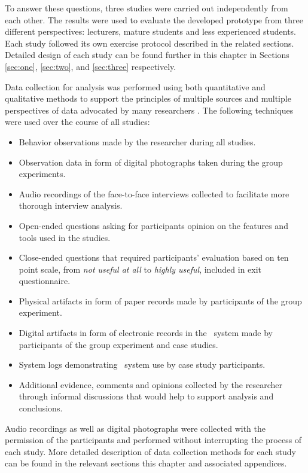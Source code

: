 To answer these questions, three studies were carried out independently from
each other. The results were used to evaluate the developed prototype from three
different perspectives: lecturers, mature students and less experienced
students. Each study followed its own exercise protocol described in the related
sections. Detailed design of each study can be found further in this chapter in
Sections \ref{sec:one}, \ref{sec:two}, and \ref{sec:three} respectively.

Data collection for analysis was performed using both quantitative and
qualitative methods to support the principles of multiple sources and multiple
perspectives of data advocated by many researchers
\citep{Yin2009,Maimbo2005,Marshall2010}. The following techniques were used over
the course of all studies:

\begin{itemize}
  \item Behavior observations made by the researcher during all studies.
  \item Observation data in form of digital photographs taken during the group
  experiments.
  \item Audio recordings of the face-to-face interviews collected to facilitate
  more thorough interview analysis.
  \item Open-ended questions asking for participants opinion on the features and
  tools used in the studies.
  \item Close-ended questions that required participants' evaluation based on
  ten point scale, from \textit{not useful at all} to \textit{highly useful}, 
  included in exit questionnaire.
  \item Physical artifacts in form of paper records made by participants of the
  group experiment.
  \item Digital artifacts in form of electronic records in the \ep~system made
  by participants of the group experiment and case studies.
  \item System logs demonstrating \ep~system use by case study participants.
  \item Additional evidence, comments and opinions collected by the researcher
  through informal discussions that would help to support analysis and
  conclusions.
\end{itemize}

Audio recordings as well as digital photographs were collected with the
permission of the participants and performed without interrupting the process of
each study. More detailed description of data collection methods for each study
can be found in the relevant sections this chapter and associated appendices. 

